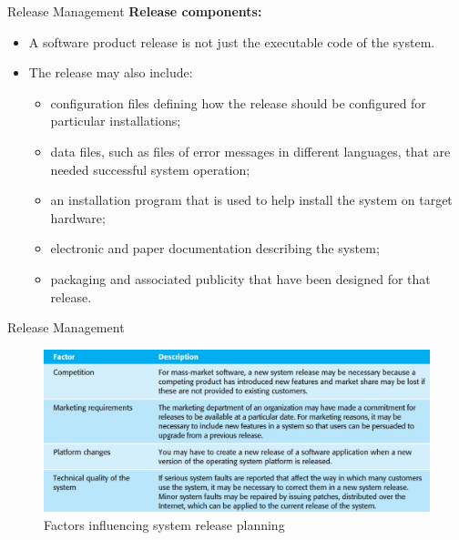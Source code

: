 \documentclass{beamer}
\begin{document}
\begin{frame}{Release Management}
	\textbf{Release components:}
	\begin{itemize}
		\item A software product release is not just the executable code of the system.
		\item The release may also include:
		\begin{itemize}
			\item configuration files defining how the release should be configured for particular installations;
			\item data files, such as files of error messages in different languages, that are needed successful system 
			operation;
			\item an installation program that is used to help install the system on target hardware;
		\item electronic and paper documentation describing the system;
			\item packaging and associated publicity that have been designed for that release.
		\end{itemize}
	\end{itemize}
\end{frame}
\begin{frame}{Release Management}
	\begin{figure}
		\includegraphics[scale=.5]{img/m4_13}
		\caption{Factors 
			influencing system 
			release planning}
	\end{figure}
\end{frame}
\end{document}
